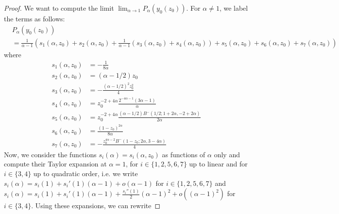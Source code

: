 \begin{proof}
We want to compute the limit $\lim_{\alpha \rightarrow 1} P_\alpha(y_0(z_0))$. For $\alpha \neq 1$, we label the terms as follows:
\begin{align*}
&P_\alpha(y_0(z_0)) \\
&= \frac{1}{\alpha-1}\left(s_1(\alpha,z_0)+s_2(\alpha,z_0)+\frac{1}{\alpha-1}(s_3(\alpha,z_0)+s_4(\alpha,z_0)) 
+s_5(\alpha,z_0)+s_6(\alpha,z_0)+s_7(\alpha,z_0)\right)
\end{align*}
where
\begin{align*}
s_1(\alpha,z_0) &= -\frac{1}{8 \alpha}\\
s_2(\alpha,z_0) &= (\alpha-1/2)z_0 \\
s_3(\alpha,z_0) &= - \frac{(\alpha - 1/2)^2 z_0^2}{4}\\
s_4(\alpha,z_0) &= z_0^{-2 + 4 \alpha} \frac{2^{-4 \alpha-1} (3 \alpha - 1)}{\alpha}\\
s_5(\alpha,z_0) &= z_0^{-2 + 4 \alpha} \frac{(\alpha - 1/2 ) B^-(1/2; 1 + 2 \alpha, -2 + 2 \alpha)}{2\alpha}\\
s_6(\alpha,z_0) &= \frac{(1 - z_0)^{2 \alpha}}{8 \alpha} \\
s_7(\alpha,z_0) &= - \frac{z_0^{4 \alpha - 2} B^-(1 - z_0; 2 \alpha, 3 - 4 \alpha)}{4}
\end{align*}
Now, we consider the functions $s_i(\alpha) = s_i(\alpha,z_0)$ as functions of $\alpha$ only and compute their Taylor 
expansion at $\alpha=1$, for $i\in \{1,2,5,6,7\}$ up to linear and for $i\in \{3,4\}$ up to quadratic order, i.e. we 
write $s_i(\alpha) = s_i(1)+s_i'(1)(\alpha-1)+o(\alpha-1)$ for $i\in \{1,2,5,6,7\}$ and 
$s_i(\alpha)=s_i(1)+s_i'(1)(\alpha-1)+\frac{s_i''(1)}{2}(\alpha-1)^2+o((\alpha-1)^2)$ for $i\in \{3,4\}$. Using these expansions, we can rewrite

\end{proof}
